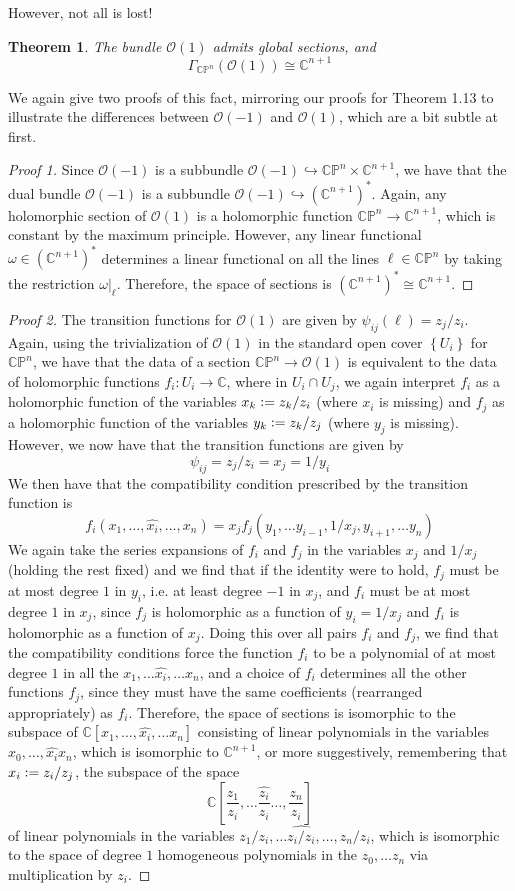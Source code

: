 \documentclass[psamsfonts, 12pt]{amsart}
\newtheorem{thm}{Theorem}[section]
\theoremstyle{definition}
\theoremstyle{remark}
\renewcommand{\O}{\mathcal{O}}
\newcommand{\C}{\mathbb{C}}
\newcommand{\CP}{\mathbb{CP}}
\newcommand{\set}[1]{\left\lbrace #1 \right\rbrace}
\newcommand{\defeq}{\vcentcolon=}
\begin{document}
%
However, not all is lost!
%
\begin{thm}
The bundle $\O(1)$ admits global sections, and
\[
\Gamma_{\CP^n}(\O(1)) \cong \C^{n+1}
\]
\end{thm}
%
We again give two proofs of this fact, mirroring our proofs for Theorem 1.13 to
illustrate the differences between $\O(-1)$ and $\O(1)$, which are a bit subtle at
first.
%
\begin{proof}[Proof 1]
Since $\O(-1)$ is a subbundle $\O(-1) \hookrightarrow \CP^n \times \C^{n+1}$, we
have that the dual bundle $\O(-1)$ is a subbundle $\O(-1) \hookrightarrow (\C^{n+1})^*$.
Again, any holomorphic section of $\O(1)$ is a holomorphic function
$\CP^n \to \C^{n+1}$, which is constant by the maximum principle. However, any
linear functional $\omega \in (\C^{n+1})^*$ determines a linear functional on
all the lines $\ell \in \CP^n$ by taking the restriction $\omega|_\ell$. Therefore,
the space of sections is $(\C^{n+1})^* \cong \C^{n+1}$.
\end{proof}
%
\begin{proof}[Proof 2]
The transition functions for $\O(1)$ are given by $\psi_{ij}(\ell) = z_j/z_i$. Again,
using the trivialization of $\O(1)$ in the standard open cover $\set{U_i}$ for
$\CP^n$, we have that the data of a section $\CP^n \to \O(1)$ is equivalent to
the data of holomorphic functions $f_i : U_i \to \C$, where in $U_i \cap U_j$, we again
interpret $f_i$ as a holomorphic function of the variables  $x_k \defeq z_k/z_i$
(where $x_i$ is missing) and $f_j$ as a holomorphic function of the variables
$y_k \defeq z_k/z_j$ (where $y_j$ is missing). However, we now have that the transition
functions are given by
\[
\psi_{ij} = z_j/z_i = x_j = 1/y_i
\]
We then have that the compatibility condition prescribed by the transition function
is
\[
f_i(x_1,\ldots,\widehat{x_i},\ldots, x_n) =
x_jf_j(y_1,\ldots y_{i-1}, 1/x_j, y_{i+1}, \ldots y_n)
\]
We again take the series expansions of $f_i$ and $f_j$ in the variables $x_j$
and $1/x_j$ (holding the rest fixed)  and we find that if the identity were to hold,
$f_j$ must be at most degree $1$ in $y_i$, i.e. at least degree $-1$ in $x_j$,
and $f_i$ must be at most degree $1$ in $x_j$, since $f_j$ is holomorphic as a function
of $y_i = 1/x_j$ and $f_i$ is holomorphic as a function of $x_j$. Doing this over
all pairs $f_i$ and $f_j$, we find that the compatibility conditions force the
function $f_i$ to be a polynomial of at most degree $1$ in all the
$x_1, \ldots \widehat{x_i}, \ldots x_n$, and a choice of $f_i$ determines all the other
functions $f_j$, since they must have the same coefficients (rearranged appropriately)
as $f_i$. Therefore, the space of sections is isomorphic to the subspace of
$\C[x_1,\ldots,\widehat{x_i},\ldots x_n]$ consisting of linear polynomials in the
variables $x_0, \ldots, \widehat{x_i} x_n$, which is isomorphic to $\C^{n+1}$, or more
suggestively, remembering that $x_i \defeq z_i/z_j$,  the subspace of the space
\[
\C\left[\frac{z_1}{z_i},\ldots \widehat{\frac{z_i}{z_i}}\ldots,\frac{z_n}{z_i}\right]
\]
of linear polynomials in the variables $z_1/z_i,\ldots \widehat{z_i/z_i},\ldots ,z_n/z_i$,
which is isomorphic to the space of degree $1$ homogeneous polynomials in the
$z_0,\ldots z_n$ via multiplication by $z_i$.
\end{proof}
\end{document}
